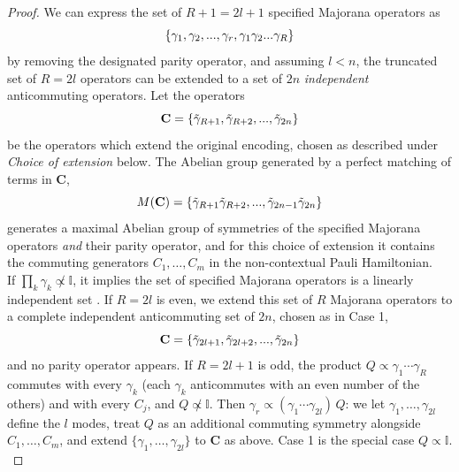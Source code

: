 \documentclass[%
 aip,
 amsmath,amssymb,
 reprint,%
]{revtex4-1}
\newcommand{\Id}{\mathbb{I}}       %
\newcommand{\kLinIndepAnti}{R}           %
\begin{document}
\begin{proof}
    \indent { \textbf{ Case 1, $\mathbf{\prod_{{k}} \gamma_{{k}} {\propto} \Id}$:}} We can express the set of ${\kLinIndepAnti+1 = 2l+1}$ {specified} Majorana operators as 
    \begin{equation}
        \{ \gamma_1, \gamma_2, ..., \gamma_{{r}}, \gamma_{1}\gamma_2 ...\gamma_{{\kLinIndepAnti}}\} \notag
        \label{eq:dependent-majorana-set}
    \end{equation}
    by removing the designated parity operator, and assuming $l < n$, the truncated set of ${\kLinIndepAnti = 2l}$ operators can be extended to a set of $2n$ {\it independent} anticommuting operators. Let the operators 
    \begin{equation}
        \mathbf{C} = \{\tilde{\gamma}_{{\kLinIndepAnti+1}}, \tilde{\gamma}_{{\kLinIndepAnti+2}}, ...,  \tilde{\gamma}_{2n}\} \notag
        \label{eq:dependent-majorana-extension}
    \end{equation}
    be the operators which extend the original encoding{, chosen as described under \textit{Choice of extension} below}. The Abelian group generated by a perfect matching of terms in $\mathbf{C}$, 
    \begin{equation}
        M(\mathbf{C}) = \{\tilde{\gamma}_{{\kLinIndepAnti+1}} \tilde{\gamma}_{{\kLinIndepAnti+2}},...,\tilde{\gamma}_{2n-1}\tilde{\gamma}_{2n} \} \notag
        \label{eq:dependent-majorana-matching}
    \end{equation}
    {generates a maximal Abelian group of} symmetries of the specified Majorana operators {\it and} their parity operator, and {for this choice of extension it contains the commuting generators $C_1, \dots, C_m$} in the non-contextual Pauli Hamiltonian. \\
    \indent { \textbf{Case 2, $\mathbf{\prod_{{k}} \gamma_{{k}} {\not\propto} \Id}$:}} If $\prod_{{k}} \gamma_{{k}} {\not\propto} \Id$, it implies the set of specified Majorana operators is a linearly independent set \cite{sarkar2019setscommutinganticommutingpaulis}. {If $\kLinIndepAnti = 2l$ is even, we} extend this set of $\kLinIndepAnti$ Majorana operators to a complete independent anticommuting set of $2n${, chosen as in Case 1,}
    \begin{equation}
        \mathbf{C} = \{\tilde{\gamma}_{{2l+1}}, \tilde{\gamma}_{{2l+2}}, ...,  \tilde{\gamma}_{2n}\} \notag
        \label{eq:independent-majorana-extension}
    \end{equation}
{and no parity operator appears. If $\kLinIndepAnti = 2l+1$ is odd, the product $Q \propto \gamma_1 \cdots \gamma_{\kLinIndepAnti}$ commutes with every $\gamma_k$ (each $\gamma_k$ anticommutes with an even number of the others) and with every $C_j$, and $Q \not\propto \Id$. Then $\gamma_r \propto (\gamma_1 \cdots \gamma_{2l})\, Q$: we let $\gamma_1, \dots, \gamma_{2l}$ define the $l$ modes, treat $Q$ as an additional commuting symmetry alongside $C_1, \dots, C_m$, and extend $\{\gamma_1, \dots, \gamma_{2l}\}$ to $\mathbf{C}$ as above. Case 1 is the special case $Q \propto \Id$.} \\

\end{proof}
\end{document}
